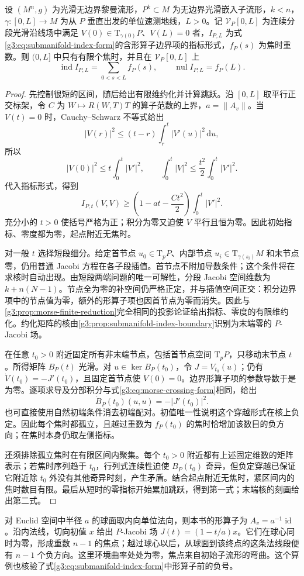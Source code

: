 \begin{theorem}\label{g3:thm:submanifold-morse-index}
	设 \((M^n,g)\) 为光滑无边界黎曼流形，\(P^k\subset M\) 为无边界光滑嵌入子流形，\(k<n\)，\(\gamma:[0,L]\to M\) 为从 \(P\) 垂直出发的单位速测地线，\(L>0\)。记 \(\mathcal V_P[0,L]\) 为连续分段光滑沿线场中满足 \(V(0)\in\mathrm T_{\gamma(0)}P\)、\(V(L)=0\) 者，\(I_{P,L}\) 为式\eqref{g3:eq:submanifold-index-form}的含形算子边界项的指标形式，\(f_P(s)\) 为焦时重数。则 \((0,L]\) 中只有有限个焦时，并且在 \(\mathcal V_P[0,L]\) 上
	\begin{equation}\label{g3:eq:submanifold-morse-count}
		\operatorname{ind}I_{P,L}=\sum_{0<s<L}f_P(s),\qquad
		\operatorname{nul}I_{P,L}=f_P(L).
	\end{equation}
\end{theorem}
\begin{proof}
	先控制很短的区间，随后给出有限维约化并计算跳跃。沿 \([0,L]\) 取平行正交标架，令 \(C\) 为 \(W\mapsto R(W,T)T\) 的算子范数的上界，\(a=\lVert A_v\rVert\)。当 \(V(t)=0\) 时，Cauchy--Schwarz 不等式给出
	\[
		|V(r)|^2\le(t-r)\int_r^t|V'(u)|^2\,\mathrm du,
	\]
	所以
	\[
		|V(0)|^2\le t\int_0^t|V'|^2,\qquad
		\int_0^t|V|^2\le\frac{t^2}{2}\int_0^t|V'|^2.
	\]
	代入指标形式，得到
	\begin{equation}\label{g3:eq:submanifold-short-index-bound}
		I_{P,t}(V,V)\ge\left(1-at-\frac{Ct^2}{2}\right)\int_0^t|V'|^2.
	\end{equation}
	充分小的 \(t>0\) 使括号严格为正；积分为零又迫使 \(V\) 平行且恒为零。因此初始指标、零度都为零，起点附近无焦时。

	对一般 \(t\) 选择短段细分。给定首节点 \(u_0\in\mathrm T_pP\)、内部节点 \(u_i\in\mathrm T_{\gamma(s_i)}M\) 和末节点零，仍用普通 Jacobi 方程在各子段插值。首节点不附加导数条件；这个条件将在求核时自动出现。由短段两端问题的唯一可解性，分段 Jacobi 空间维数为 \(k+n(N-1)\)。节点全为零的补空间仍严格正定，并与插值空间正交：积分边界项中的节点值为零，额外的形算子项也因首节点为零而消失。因此与\cref{g3:prop:morse-finite-reduction}完全相同的投影论证给出指标、零度的有限维约化。约化矩阵的核由\cref{g3:prop:submanifold-index-boundary}识别为末端零的 \(P\)-Jacobi 场。

	在任意 \(t_0>0\) 附近固定所有非末端节点，包括首节点空间 \(\mathrm T_pP\)，只移动末节点 \(t\)。所得矩阵 \(B_P(t)\) 光滑。对 \(u\in\ker B_P(t_0)\)，令 \(J=V_{t_0}(u)\)；仍有 \(\dot V(t_0)=-J'(t_0)\)，且固定首节点使 \(\dot V(0)=0\)。边界形算子项的参数导数于是为零。逐项求导及分部积分与式\eqref{g3:eq:morse-crossing-form}相同，给出
	\[
		\dot B_P(t_0)(u,u)=-|J'(t_0)|^2.
	\]
	也可直接使用自然初端条件消去初端配对。初值唯一性说明这个穿越形式在核上负定。因此每个焦时都孤立，且越过重数为 \(f_P(t_0)\) 的焦时恰增加该数目的负方向；在焦时本身仍取左侧指标。

	还须排除孤立焦时在有限区间内聚集。每个 \(t_0>0\) 附近都有上述固定维数的矩阵表示；若焦时序列趋于 \(t_0\)，行列式连续性迫使 \(B_P(t_0)\) 奇异，但负定穿越已保证它附近除 \(t_0\) 外没有其他奇异时刻，产生矛盾。结合起点附近无焦时，紧区间内的焦时数目有限。最后从短时的零指标开始累加跳跃，得到第一式；末端核的刻画给出第二式。
\end{proof}

对 Euclid 空间中半径 \(a\) 的球面取内向单位法向，则本书的形算子为 \(A_v=a^{-1}\operatorname{id}\)。沿内法线，切向初值 \(x\) 给出 \(P\)-Jacobi 场 \(J(t)=(1-t/a)x\)。它们在球心同时为零，形成重数 \(n-1\) 的焦点；越过球心以后，从球面到该终点的这条法线段便有 \(n-1\) 个负方向。这里环境曲率处处为零，焦点来自初始子流形的弯曲。这个算例也核验了式\eqref{g3:eq:submanifold-index-form}中形算子前的负号。
